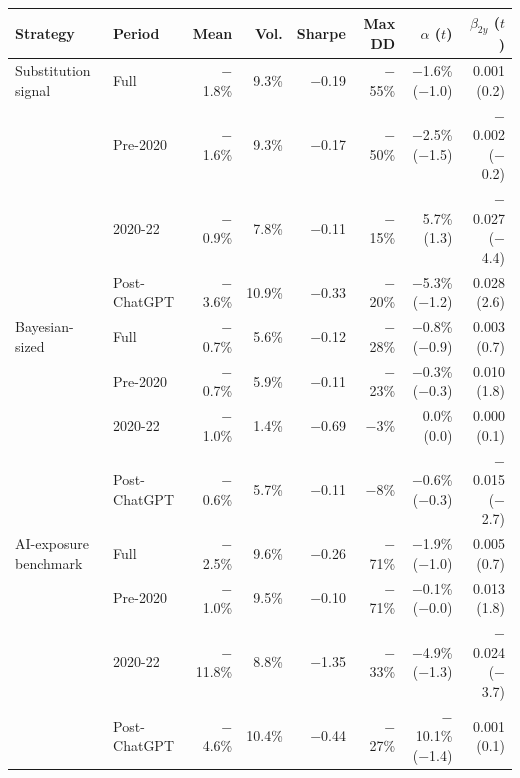 \begin{tabular}{llrrrrrr}
\toprule
Strategy & Period & Mean & Vol. & Sharpe & Max DD & $\alpha$ ($t$) & $\beta_{2y}$ ($t$) \\
\midrule
Substitution signal & Full & $-$1.8\% & 9.3\% & $-$0.19 & $-$55\% & $-$1.6\% ($-$1.0) & 0.001 (0.2) \\
 & Pre-2020 & $-$1.6\% & 9.3\% & $-$0.17 & $-$50\% & $-$2.5\% ($-$1.5) & $-$0.002 ($-$0.2) \\
 & 2020-22 & $-$0.9\% & 7.8\% & $-$0.11 & $-$15\% & 5.7\% (1.3) & $-$0.027 ($-$4.4) \\
 & Post-ChatGPT & $-$3.6\% & 10.9\% & $-$0.33 & $-$20\% & $-$5.3\% ($-$1.2) & 0.028 (2.6) \\
\addlinespace
Bayesian-sized & Full & $-$0.7\% & 5.6\% & $-$0.12 & $-$28\% & $-$0.8\% ($-$0.9) & 0.003 (0.7) \\
 & Pre-2020 & $-$0.7\% & 5.9\% & $-$0.11 & $-$23\% & $-$0.3\% ($-$0.3) & 0.010 (1.8) \\
 & 2020-22 & $-$1.0\% & 1.4\% & $-$0.69 & $-$3\% & 0.0\% (0.0) & 0.000 (0.1) \\
 & Post-ChatGPT & $-$0.6\% & 5.7\% & $-$0.11 & $-$8\% & $-$0.6\% ($-$0.3) & $-$0.015 ($-$2.7) \\
\addlinespace
AI-exposure benchmark & Full & $-$2.5\% & 9.6\% & $-$0.26 & $-$71\% & $-$1.9\% ($-$1.0) & 0.005 (0.7) \\
 & Pre-2020 & $-$1.0\% & 9.5\% & $-$0.10 & $-$71\% & $-$0.1\% ($-$0.0) & 0.013 (1.8) \\
 & 2020-22 & $-$11.8\% & 8.8\% & $-$1.35 & $-$33\% & $-$4.9\% ($-$1.3) & $-$0.024 ($-$3.7) \\
 & Post-ChatGPT & $-$4.6\% & 10.4\% & $-$0.44 & $-$27\% & $-$10.1\% ($-$1.4) & 0.001 (0.1) \\
\bottomrule
\end{tabular}

